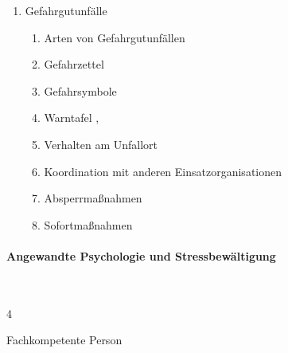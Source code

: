 \begin{enumerate}
\begin{enumerate}
      \item      Schadensplatz, Sicherheitseinrichtungen \dotfill {}
      \item      Organisation beim Großunfall \dotfill {}
      \item      Grundzüge der Triage \dotfill {}
      \item      österreichisches Patientenleitsystem \dotfill {}
      \item      Material und Ausrüstung \dotfill {}
      \item      Kommunikation \dotfill {}
    \end{enumerate}
    \item
    Gefahrgutunfälle
    \begin{enumerate}
      \item      Arten von Gefahrgutunfällen \dotfill {}
      \item      Gefahrzettel \dotfill {}
      \item      Gefahrsymbole \dotfill {}
      \item      Warntafel \dotfill {},
      \item
      Verhalten am Unfallort \dotfill {}
      \item      Koordination mit anderen Einsatzorganisationen \dotfill {}
      \item      Absperrmaßnahmen \dotfill {}
      \item      Sofortmaßnahmen \dotfill {}
    \end{enumerate}
  \end{enumerate}
  
  \paragraph{Angewandte Psychologie und Stressbewältigung}~
    
  \begin{inparadesc}
    \item[Stundenanzahl:]  4
    \item[Lehrkraft:]  Fachkompetente Person
  \end{inparadesc}
  

